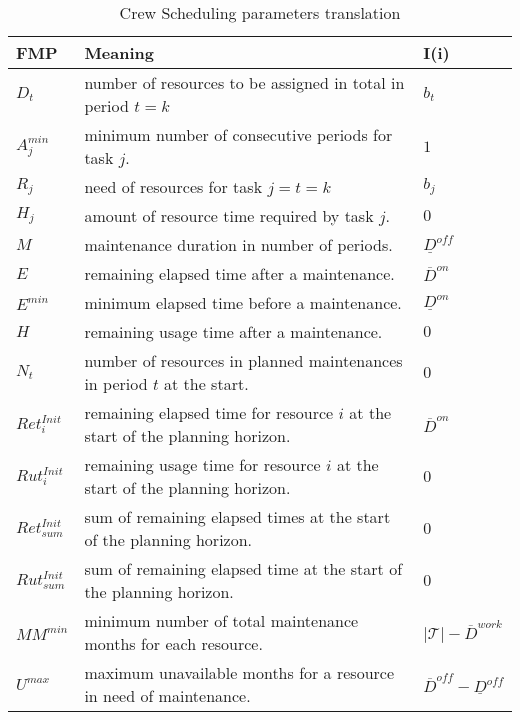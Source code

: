 \documentclass[a4paper,11pt]{article}
\begin{document}
    \begin{table}
        \begin{tabular}{l|l|l}
            \textbf{FMP}      &  \textbf{Meaning} & \textbf{I(i)} \\ \hline
            $D_t$             & number of resources to be assigned in total in period $t=k$ & $ b_t $ \\
            $A^{min}_j$       & minimum number of consecutive periods for task $j$. & $ 1 $ \\
            $R_j$             & need of resources for task $j=t=k$ & $ b_j $ \\
            $H_j$             & amount of resource time required by task $j$. & $ 0 $ \\
            $M$               & maintenance duration in number of periods. & $ \underline{D}^{off} $ \\
            $E$               & remaining elapsed time after a maintenance. & $ \overline{D}^{on} $ \\
            $E^{min}$         & minimum elapsed time before a maintenance. & $ \underline{D}^{on} $ \\
            $H$               & remaining usage time after a maintenance. & $ 0 $ \\
            $N_t$             & number of resources in planned maintenances in period $t$ at the start. & $ 0 $ \\
            $Ret^{Init}_i$      & remaining elapsed time for resource $i$ at the start of the planning horizon. & $ \overline{D}^{on} $ \\
            $Rut^{Init}_i$      & remaining usage time for resource $i$ at the start of the planning horizon. & $ 0 $ \\
            $Ret^{Init}_{sum}$  & sum of remaining elapsed times at the start of the planning horizon. & $ 0 $\\
            $Rut^{Init}_{sum}$  & sum of remaining elapsed time at the start of the planning horizon. & $ 0 $ \\
            $MM^{min}$          & minimum number of total maintenance months for each resource. & $ |\mathcal{T}| - \overline{D}^{work} $ \\
            $U^{max}$          & maximum unavailable months for a resource in need of maintenance. & $ \overline{D}^{off} - \underline{D}^{off} $ \\
        \end{tabular}
         \caption{Crew Scheduling parameters translation}
        \label{tab:parameters_crew}
    \end{table}
\end{document}
